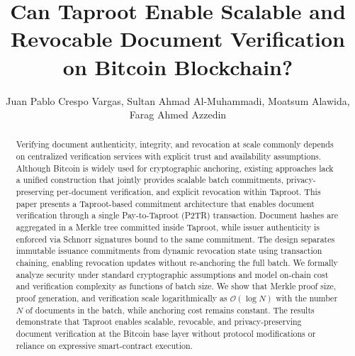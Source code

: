\documentclass{IEEEoj}
\begin{document}

\title{Can Taproot Enable Scalable and Revocable Document Verification on Bitcoin Blockchain?
}

\author{
Juan Pablo Crespo Vargas,
Sultan Ahmad Al-Muhammadi,
Moatsum Alawida,
Farag Ahmed Azzedin
}




\begin{abstract}
Verifying document authenticity, integrity, and revocation at scale commonly depends on centralized verification services with explicit trust and availability assumptions.
Although Bitcoin is widely used for cryptographic anchoring, existing approaches lack a unified construction that jointly provides scalable batch commitments, privacy-preserving per-document verification, and explicit revocation within Taproot.
This paper presents a Taproot-based commitment architecture that enables document verification through a single Pay-to-Taproot (P2TR) transaction.
Document hashes are aggregated in a Merkle tree committed inside Taproot, while issuer authenticity is enforced via Schnorr signatures bound to the same commitment.
The design separates immutable issuance commitments from dynamic revocation state using transaction chaining, enabling revocation updates without re-anchoring the full batch.
We formally analyze security under standard cryptographic assumptions and model on-chain cost and verification complexity as functions of batch size.
We show that Merkle proof size, proof generation, and verification scale logarithmically as $\mathcal{O}(\log N)$ with the number $N$ of documents in the batch, while anchoring cost remains constant.
The results demonstrate that Taproot enables scalable, revocable, and privacy-preserving document verification at the Bitcoin base layer without protocol modifications or reliance on expressive smart-contract execution.
\end{abstract}
\end{document}
